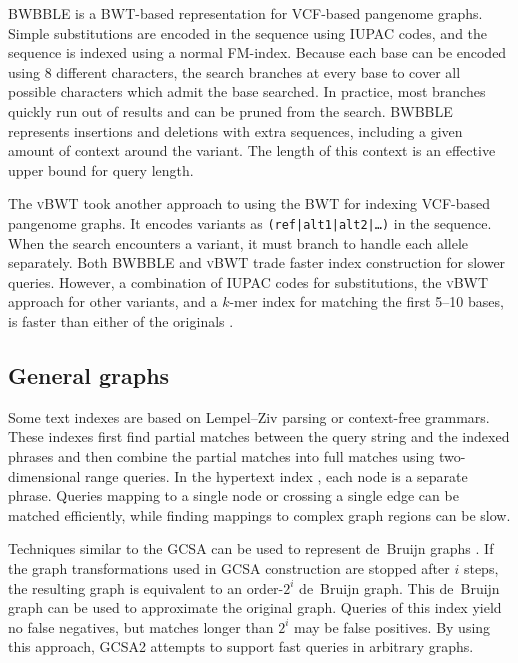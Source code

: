 \textsc{BWBBLE} \cite{Huang_2013} is a BWT-based representation for VCF-based pangenome graphs.
Simple substitutions are encoded in the sequence using IUPAC codes, and the sequence is indexed using a normal FM-index.
Because each base can be encoded using 8 different characters, the search branches at every base to cover all possible characters which admit the base searched.
In practice, most branches quickly run out of results and can be pruned from the search.
\textsc{BWBBLE} represents insertions and deletions with extra sequences, including a given amount of context around the variant.
The length of this context is an effective upper bound for query length.

The \textsc{vBWT} \cite{Maciuca_2016} took another approach to using the BWT for indexing VCF-based pangenome graphs.
It encodes variants as \texttt{(ref|alt1|alt2|\dots)} in the sequence.
When the search encounters a variant, it must branch to handle each allele separately.
Both \textsc{BWBBLE} and \textsc{vBWT} trade faster index construction for slower queries.
However, a combination of IUPAC codes for substitutions, the \textsc{vBWT} approach for other variants, and a $k$-mer index for matching the first 5--10 bases, is faster than either of the originals \cite{Buechler_2019}.

\subsection{General graphs}

Some text indexes are based on Lempel--Ziv parsing or context-free grammars.
These indexes first find partial matches between the query string and the indexed phrases and then combine the partial matches into full matches using two-dimensional range queries.
In the hypertext index \cite{Thachuk_2013}, each node is a separate phrase.
Queries mapping to a single node or crossing a single edge can be matched efficiently, while finding mappings to complex graph regions can be slow.

Techniques similar to the \textsc{GCSA} can be used to represent de~Bruijn graphs \cite{Bowe_2012}.
If the graph transformations used in \textsc{GCSA} construction are stopped after $i$ steps, the resulting graph is equivalent to an order-$2^{i}$ de~Bruijn graph.
This de~Bruijn graph can be used to approximate the original graph.
Queries of this index yield no false negatives, but matches longer than $2^{i}$ may be false positives.
By using this approach, \textsc{GCSA2} \cite{Siren_2017} attempts to support fast queries in arbitrary graphs.

